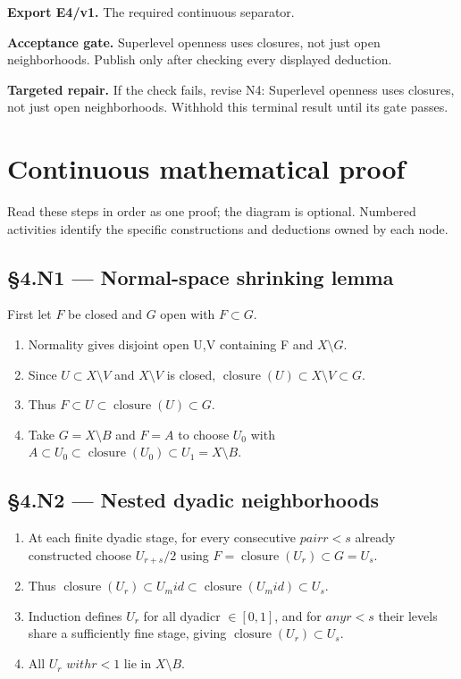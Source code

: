 \documentclass[preprint,12pt,aps,pra,showkeys,amsmath,amssymb,superscriptaddress,floatfix]{revtex4-2}
\theoremstyle{definition}
\theoremstyle{remark}
\newcommand{\field}[2]{\par\smallskip\noindent\textbf{#1.} #2\par}
\begin{document}
\field{Export E4/v1}{The required continuous separator.}

\field{Acceptance gate}{Superlevel openness uses closures, not just open neighborhoods. Publish
only after checking every displayed deduction.}

\field{Targeted repair}{If the check fails, revise N4: Superlevel openness uses closures, not
just open neighborhoods. Withhold this terminal result until its gate
passes.}

\endgroup\clearpage\section{Continuous mathematical proof}\label{sec:proof}

Read these steps in order as one proof; the diagram is optional.
Numbered activities identify the specific constructions and deductions
owned by each node.

\subsection{§4.N1 --- Normal-space shrinking
lemma}\label{n1-normal-space-shrinking-lemma}

First let \(F\) be closed and \(G\) open with \(F\subset G\).

\begin{enumerate}
\def\labelenumi{\arabic{enumi}.}
\item
  Normality gives disjoint open U,V containing F and \(X\setminus G\).
\item
  Since \(U\subset X\setminus V\) and \(X\setminus V\) is closed,
  \(\operatorname{closure} (U)\subset X\setminus V\subset G\).
\item
  Thus \(F\subset U\subset \operatorname{closure} (U)\subset G\).
\item
  Take \(G=X\setminus B\) and \(F=A\) to choose \(U_{0}\) with
  \(A\subset U_{0}\subset \operatorname{closure} (U_{0})\subset U_{1}=X\setminus B\).
\end{enumerate}

\subsection{§4.N2 --- Nested dyadic
neighborhoods}\label{n2-nested-dyadic-neighborhoods}

\begin{enumerate}
\def\labelenumi{\arabic{enumi}.}
\item
  At each finite dyadic stage, for every consecutive \(pairr<s\) already
  constructed choose \(U_{r+s}/2\) using
  \(F=\operatorname{closure} (U_r)\subset G=U_s\).
\item
  Thus
  \(\operatorname{closure} (U_r)\subset U_mid\subset \operatorname{closure} (U_mid)\subset U_s\).
\item
  Induction defines \(U_r\) for all dyadicr \(\in [0,1]\), and for
  \(anyr<s\) their levels share a sufficiently fine stage, giving
  \(\operatorname{closure} (U_r)\subset U_s\).
\item
  All \(U_r\) \(withr<1\) lie in \(X\setminus B\).
\end{enumerate}
\end{document}
